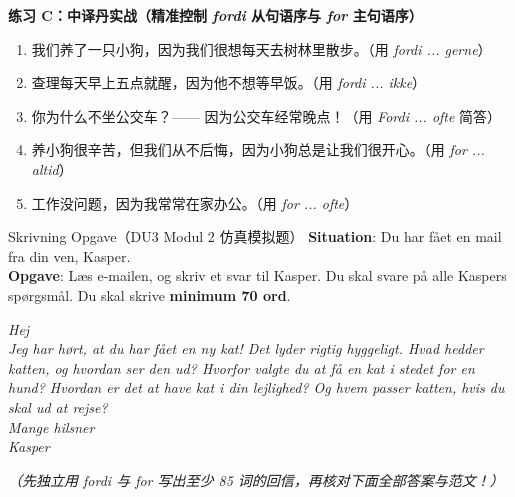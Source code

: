 \textbf{练习 C：中译丹实战（精准控制 \textit{fordi} 从句语序与 \textit{for} 主句语序）}
\begin{enumerate}
  \item 我们养了一只小狗，因为我们很想每天去树林里散步。（用 \textit{fordi ... gerne}）
  \item 查理每天早上五点就醒，因为他不想等早饭。（用 \textit{fordi ... ikke}）
  \item 你为什么不坐公交车？—— 因为公交车经常晚点！（用 \textit{Fordi ... ofte} 简答）
  \item 养小狗很辛苦，但我们从不后悔，因为小狗总是让我们很开心。（用 \textit{for ... altid}）
  \item 工作没问题，因为我常常在家办公。（用 \textit{for ... ofte}）
\end{enumerate}


\begin{emailbox}{Skrivning Opgave（DU3 Modul 2 仿真模拟题）}
\textbf{Situation}: Du har fået en mail fra din ven, Kasper.\\
\textbf{Opgave}: Læs e-mailen, og skriv et svar til Kasper. Du skal svare på alle Kaspers spørgsmål. Du skal skrive \textbf{minimum 70 ord}.

\vspace{0.3em}
\textit{Hej\\
Jeg har hørt, at du har fået en ny kat! Det lyder rigtig hyggeligt. Hvad hedder katten, og hvordan ser den ud? Hvorfor valgte du at få en kat i stedet for en hund? Hvordan er det at have kat i din lejlighed? Og hvem passer katten, hvis du skal ud at rejse?\\
Mange hilsner\\
Kasper}
\end{emailbox}

\textit{（先独立用 \textit{fordi} 与 \textit{for} 写出至少 85 词的回信，再核对下面全部答案与范文！）}

